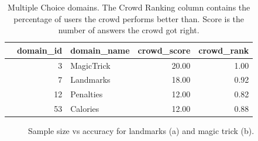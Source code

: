 \documentclass[12pt]{article}
\begin{document}
\begin{table}[ht]
\centering
\begin{tabular}{rrlrr}
  \hline
 & domain\_id & domain\_name & crowd\_score & crowd\_rank \\ 
  \hline
  &   3 & MagicTrick & 20.00 & 1.00 \\ 
  &   7 & Landmarks & 18.00 & 0.92 \\ 
  &  12 & Penalties & 12.00 & 0.82 \\ 
  &  53 & Calories &  12.00 & 0.88 \\ 
   \hline
\end{tabular}
\caption{Multiple Choice domains. The Crowd Ranking column contains the percentage of users the crowd performs better than. Score is the number of answers the crowd got right.} 
\end{table}




\begin{figure}[ht!]
     \begin{center}
    \end{center}
    \caption{Sample size vs accuracy for landmarks (a) and magic trick (b).}
\end{figure}
\end{document}
